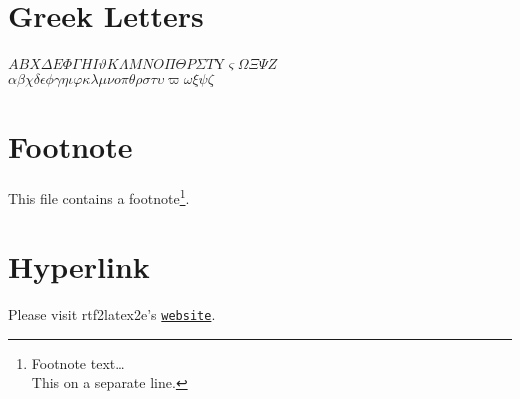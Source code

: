 \documentclass{article}
\def\R2Lurl#1#2{\mbox{\href{#1}{\tt #2}}}
\begin{document}
\section*{Greek Letters}
\ensuremath{A}\ensuremath{B}\ensuremath{X}\ensuremath{\Delta}\ensuremath{E}\ensuremath{\Phi}\ensuremath{\Gamma}\ensuremath{H}\ensuremath{I}\ensuremath{\vartheta}\ensuremath{K}\ensuremath{\Lambda}\ensuremath{M}\ensuremath{N}\ensuremath{O}\ensuremath{\Pi}\ensuremath{\Theta}\ensuremath{P}\ensuremath{\Sigma}\ensuremath{T}Y\ensuremath{\varsigma}\ensuremath{\Omega}\ensuremath{\Xi}\ensuremath{\Psi}\ensuremath{Z}\\
\ensuremath{\alpha}\ensuremath{\beta}\ensuremath{\chi}\ensuremath{\delta}\ensuremath{\epsilon}\ensuremath{\phi}\ensuremath{\gamma}\ensuremath{\eta}\ensuremath{\iota}\ensuremath{\varphi}\ensuremath{\kappa}\ensuremath{\lambda}\ensuremath{\mu}\ensuremath{\nu}\ensuremath{o}\ensuremath{\pi}\ensuremath{\theta}\ensuremath{\rho}\ensuremath{\sigma}\ensuremath{\tau}\ensuremath{\upsilon}\ensuremath{\varpi}\ensuremath{\omega}\ensuremath{\xi}\ensuremath{\psi}\ensuremath{\zeta}



\section*{Footnote}
This file contains a footnote\footnote{Footnote text\dots  \\
This on a separate line.}.



\section*{Hyperlink}
Please visit rtf2latex2e's \R2Lurl{http://members.home.net/setlur/rtf2latex2e }{website}.
\end{document}
